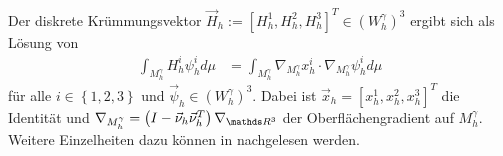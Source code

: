   Der diskrete Krümmungsvektor \( \vec{H}_{h} := \left[ H_{h}^{1}, H_{h}^{2}, H_{h}^{3} \right]^{T} \in\left( W_{h}^{\gamma} \right)^{3} \) ergibt sich als Lösung von
  \begin{align}
    \int_{M_{h}^{\gamma}} H_{h}^{i} \psi_{h}^{i} d\mu
      &=  \int_{M_{h}^{\gamma}} \nabla_{M_{h}^{\gamma}} x_{h}^{i} \cdot \nabla_{M_{h}^{\gamma}}\psi_{h}^{i} d\mu
  \end{align}
  für alle \( i\in\left\{ 1,2,3 \right\} \) und \( \vec{\psi}_{h}\in \left( W_{h}^{\gamma} \right)^{3} \).
  Dabei ist \( \vec{x}_{h} = \left[ x_{h}^{1}, x_{h}^{2}, x_{h}^{3}\right]^{T} \) die Identität 
  und \(\nabla_{M_{h}^{\gamma}} = \left( I - \vec{\nu}_{h} \vec{\nu}^{T}_{h} \right)\nabla_{\R^{3}} \) der Oberflächengradient auf \( M_{h}^{\gamma} \). 
  Weitere Einzelheiten dazu können in \cite{heine} nachgelesen werden.

